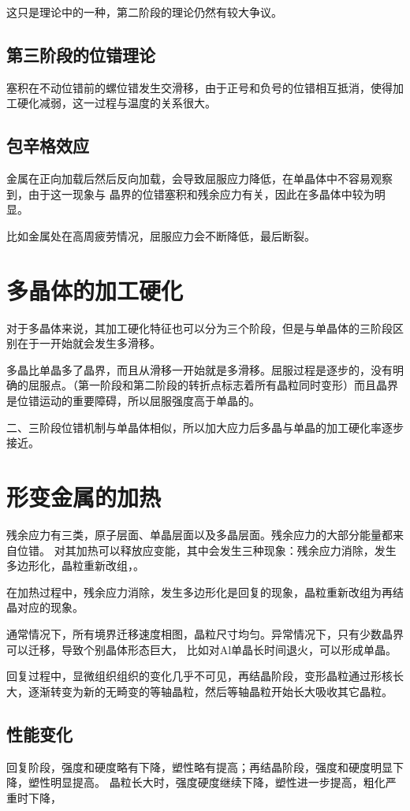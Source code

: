            这只是理论中的一种，第二阶段的理论仍然有较大争议。
        \subsection{第三阶段的位错理论}
            塞积在不动位错前的螺位错发生交滑移，由于正号和负号的位错相互抵消，使得加工硬化减弱，这一过程与温度的关系很大。
        \subsection{包辛格效应}
            金属在正向加载后然后反向加载，会导致屈服应力降低，在单晶体中不容易观察到，由于这一现象与
            晶界的位错塞积和残余应力有关，因此在多晶体中较为明显。

            比如金属处在高周疲劳情况，屈服应力会不断降低，最后断裂。
    
    \section{多晶体的加工硬化}
        对于多晶体来说，其加工硬化特征也可以分为三个阶段，但是与单晶体的三阶段区别在于一开始就会发生多滑移。

        多晶比单晶多了晶界，而且从滑移一开始就是多滑移。屈服过程是逐步的，没有明确的屈服点。（第一阶段和第二阶段的转折点标志着所有晶粒同时变形）而且晶界是位错运动的重要障碍，所以屈服强度高于单晶的。
        
        二、三阶段位错机制与单晶体相似，所以加大应力后多晶与单晶的加工硬化率逐步接近。
        
    \section{形变金属的加热}
        残余应力有三类，原子层面、单晶层面以及多晶层面。残余应力的大部分能量都来自位错。
        对其加热可以释放应变能，其中会发生三种现象：残余应力消除，发生多边形化，晶粒重新改组，。

        在加热过程中，残余应力消除，发生多边形化是回复的现象，晶粒重新改组为再结晶对应的现象。

        通常情况下，所有境界迁移速度相图，晶粒尺寸均匀。异常情况下，只有少数晶界可以迁移，导致个别晶体形态巨大，
        比如对Al单晶长时间退火，可以形成单晶。

        回复过程中，显微组织组织的变化几乎不可见，再结晶阶段，变形晶粒通过形核长大，逐渐转变为新的无畸变的等轴晶粒，然后等轴晶粒开始长大吸收其它晶粒。

        \subsection{性能变化}
            回复阶段，强度和硬度略有下降，塑性略有提高；再结晶阶段，强度和硬度明显下降，塑性明显提高。
            晶粒长大时，强度硬度继续下降，塑性进一步提高，粗化严重时下降，


